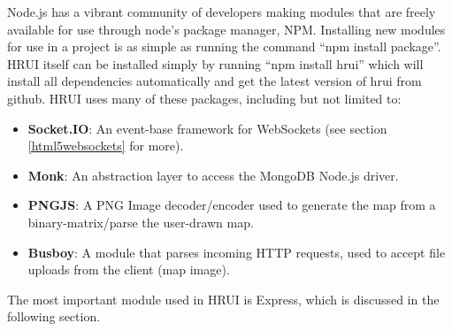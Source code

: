 Node.js has a vibrant community of developers making modules that are freely available for use through node's package manager,
NPM. Installing new modules for use in a project is as simple as running the command ``npm install package''. HRUI itself can
be installed simply by running ``npm install hrui'' which will install all dependencies automatically and get the latest
version of hrui from github. HRUI uses many of these packages, including but not limited to:
\begin{itemize}
  \item \textbf{Socket.IO}: An event-base framework for WebSockets (see section \ref{html5websockets} for more).
  \item \textbf{Monk}: An abstraction layer to access the MongoDB Node.js driver.
  \item \textbf{PNGJS}: A PNG Image decoder/encoder used to generate the map from a binary-matrix/parse the user-drawn map.
  \item \textbf{Busboy}: A module that parses incoming HTTP requests, used to accept file uploads from the client (map image).
\end{itemize}
The most important module used in HRUI is Express, which is discussed in the following section.

